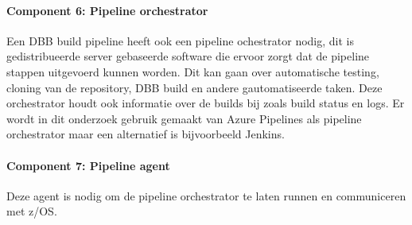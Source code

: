 \paragraph{Component 6: Pipeline orchestrator}
Een DBB build pipeline heeft ook een pipeline ochestrator nodig, dit is gedistribueerde server gebaseerde software die ervoor zorgt dat de pipeline stappen uitgevoerd kunnen worden. Dit kan gaan over automatische testing, cloning van de repository, DBB build en andere gautomatiseerde taken. Deze orchestrator houdt ook informatie over de builds bij zoals build status en logs. Er wordt in dit onderzoek gebruik gemaakt van Azure Pipelines als pipeline orchestrator maar een alternatief is bijvoorbeeld Jenkins.
\paragraph{Component 7: Pipeline agent}
Deze agent is nodig om de pipeline orchestrator te laten runnen en communiceren met z/OS.
